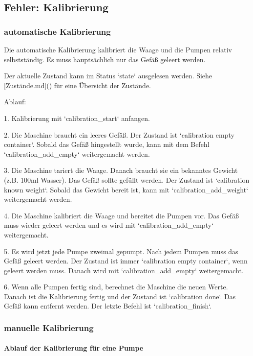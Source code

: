 \subsection{Fehler: Kalibrierung}
\subsubsection{ automatische Kalibrierung}

Die automatische Kalibrierung kalibriert die Waage und die Pumpen relativ selbstständig. Es muss hauptsächlich nur das Gefäß geleert werden.

Der aktuelle Zustand kann im Status `state` ausgelesen werden. Siehe [Zustände.md]() für eine Übersicht der Zustände.

Ablauf:

1. Kalibrierung mit `calibration\_start` anfangen.

2. Die Maschine braucht ein leeres Gefäß. Der Zustand ist `calibration empty container`. Sobald das Gefäß hingestellt wurde, kann mit dem Befehl `calibration\_add\_empty` weitergemacht werden.

3. Die Maschine tariert die Waage. Danach braucht sie ein bekanntes Gewicht (z.B. 100ml Wasser). Das Gefäß sollte gefüllt werden. Der Zustand ist `calibration known weight`. Sobald das Gewicht bereit ist, kann mit `calibration\_add\_weight` weitergemacht werden.

4. Die Maschine kalibriert die Waage und bereitet die Pumpen vor. Das Gefäß muss wieder geleert werden und es wird mit `calibration\_add\_empty` weitergemacht.

5. Es wird jetzt jede Pumpe zweimal gepumpt. Nach jedem Pumpen muss das Gefäß geleert werden. Der Zustand ist immer `calibration empty container`, wenn geleert werden muss. Danach wird mit `calibration\_add\_empty` weitergemacht.

6. Wenn alle Pumpen fertig sind, berechnet die Maschine die neuen Werte. Danach ist die Kalibrierung fertig und der Zustand ist `calibration done`. Das Gefäß kann entfernt werden. Der letzte Befehl ist `calibration\_finish`.


\subsubsection{ manuelle Kalibrierung}

\paragraph{ Ablauf der Kalibrierung für eine Pumpe}

